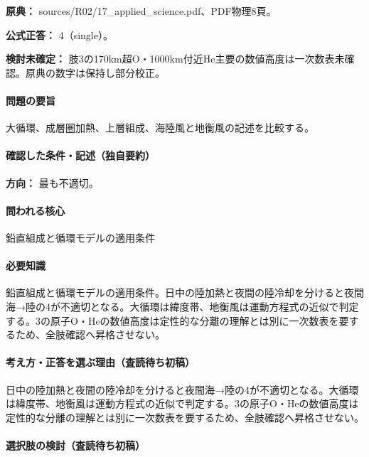 \noindent\textbf{原典：} sources/R02/17\_applied\_science.pdf、PDF物理8頁。

\textbf{公式正答：} 4（single）。

\par\textbf{検討未確定：} 肢3の170km超O・1000km付近He主要の数値高度は一次数表未確認。原典の数字は保持し部分校正。

\paragraph{問題の要旨} 大循環、成層圏加熱、上層組成、海陸風と地衡風の記述を比較する。

\paragraph{確認した条件・記述（独自要約）}\mbox{}\par

\noindent\textbf{方向：} 最も不適切。\par

\paragraph{問われる核心} 鉛直組成と循環モデルの適用条件

\paragraph{必要知識} 鉛直組成と循環モデルの適用条件。日中の陸加熱と夜間の陸冷却を分けると夜間海→陸の4が不適切となる。大循環は緯度帯、地衡風は運動方程式の近似で判定する。3の原子O・Heの数値高度は定性的な分離の理解とは別に一次数表を要するため、全肢確認へ昇格させない。

\paragraph{考え方・正答を選ぶ理由（査読待ち初稿）} 日中の陸加熱と夜間の陸冷却を分けると夜間海→陸の4が不適切となる。大循環は緯度帯、地衡風は運動方程式の近似で判定する。3の原子O・Heの数値高度は定性的な分離の理解とは別に一次数表を要するため、全肢確認へ昇格させない。

\paragraph{選択肢の検討（査読待ち初稿）}\mbox{}\par

